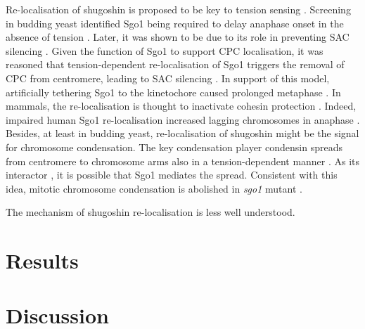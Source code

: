 Re-localisation of shugoshin is proposed to be key to tension sensing \citep{Marston2015}. Screening in budding yeast identified Sgo1 being required to delay anaphase onset in the absence of tension \citep{Indjeian2005a}. Later, it was shown to be due to its role in preventing SAC silencing \citep{Jin2013TheAttachment}. Given the function of Sgo1 to support CPC localisation, it was reasoned that tension-dependent re-localisation of Sgo1 triggers the removal of CPC from centromere, leading to SAC silencing \citep{Nerusheva2014}. In support of this model, artificially tethering Sgo1 to the kinetochore caused prolonged metaphase \citep{Su2021SumoylationAnaphase}. In mammals, the re-localisation is thought to inactivate cohesin protection \citep{Lee2008}. Indeed, impaired human Sgo1 re-localisation increased lagging chromosomes in anaphase \citep{Liu2013}. Besides, at least in budding yeast, re-localisation of shugoshin might be the signal for chromosome condensation. The key condensation player condensin spreads from centromere to chromosome arms also in a tension-dependent manner \citep{Leonard2015}. As its interactor \citep{Yahya2020, Verzijlbergen2014, Peplowska2014}, it is possible that Sgo1 mediates the spread. Consistent with this idea, mitotic chromosome condensation is abolished in \textit{sgo1} mutant \citep{Kruitwagen2018}. 

The mechanism of shugoshin re-localisation is less well understood. 



\section{Results}
\subsection{}
\section{Discussion}
